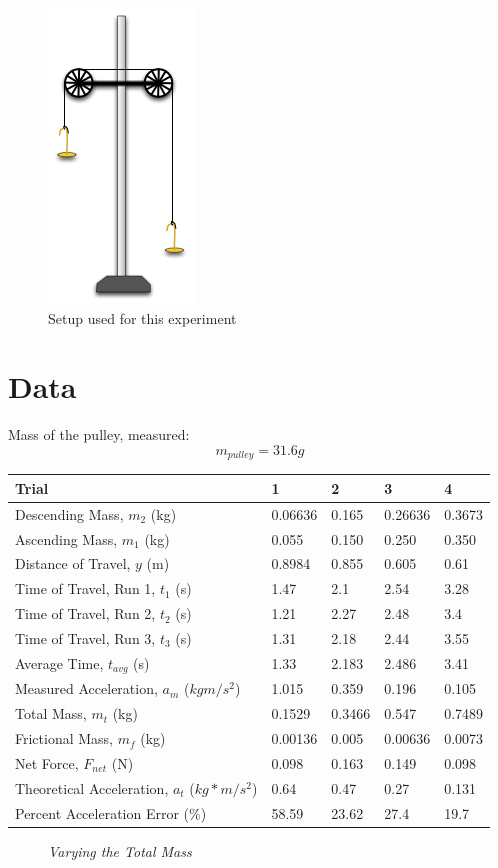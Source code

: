\documentclass[11pt, titlepage]{article}
\begin{document}
\pagebreak
\begin{figure}[!ht]
\centering
\vspace*{1.5cm}
\includegraphics[scale=1.5, angle=0]{lab1.jpg}
\caption{Setup used for this experiment}
\end{figure}

\pagebreak
\section*{Data}
Mass of the pulley, measured:$$m_{pulley} = 31.6 g$$
\begin{center}
\begin{tabular}
{|m{7em}|m{7em}|m{7em}|m{7em}|m{7em}|}
\hline
Trial & 1 & 2 & 3 & 4 \\
\hline
Descending Mass, $m_2$ (kg) & 0.06636 & 0.165 & 0.26636 & 0.3673\\
\hline
Ascending Mass, $m_1$ (kg) & 0.055 & 0.150 & 0.250 & 0.350\\
\hline
Distance of Travel, $y$ (m) & 0.8984 & 0.855 & 0.605 & 0.61\\
\hline
Time of Travel, Run 1, $t_1$ (s) & 1.47 & 2.1 & 2.54 & 3.28\\
\hline
Time of Travel, Run 2, $t_2$ (s) & 1.21 & 2.27 & 2.48 & 3.4\\
\hline
Time of Travel, Run 3, $t_3$ (s) & 1.31 & 2.18 & 2.44 & 3.55\\
\hline
Average Time, $t_{avg}$ (s) & 1.33 & 2.183 & 2.486 & 3.41\\
\hline
Measured Acceleration, $a_m$ ($kgm/s^2$) & 1.015 & 0.359 & 0.196 & 0.105\\
\hline
Total Mass, $m_t$ (kg) & 0.1529 & 0.3466 & 0.547 & 0.7489\\
\hline
Frictional Mass, $m_f$ (kg) & 0.00136 & 0.005 & 0.00636 & 0.0073\\
\hline
Net Force, $F_{net}$ (N) & 0.098 & 0.163 & 0.149 & 0.098\\ 
\hline
Theoretical Acceleration, $a_t$ ($kg*m/s^2$) & 0.64 & 0.47 & 0.27 & 0.131\\
\hline
Percent Acceleration Error (\%) & 58.59 & 23.62 & 27.4 & 19.7\\
\hline
\end{tabular}
\begin{figure}[!ht]
\caption{\emph{Varying the Total Mass}}
\end{figure}
\end{center}
\pagebreak
\end{document}
